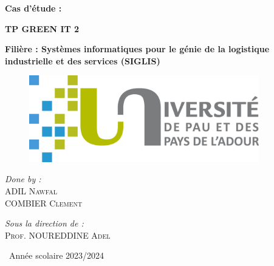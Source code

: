 \documentclass[12pt, a4paper]{report}
\begin{document}
\begin{titlepage}

	
	\begin{center}
		
		{ \Huge \bfseries Cas d'étude :}
  
		\vspace{1cm}
  
        {\bfseries\Huge TP GREEN IT 2}
		
		
		\vspace*{1cm}

        \hfill

	    
		\Large \textbf{Filière : Systèmes informatiques pour le génie de la logistique industrielle et des services (SIGLIS)}\\

        \vspace{2cm}

       
  
  
        \begin{figure}[H]
        \centering
            \includegraphics[width=10cm]{uppa.png}
        \end{figure}



        \end{center}

\vspace{3cm}


\begin{minipage}{0.4\textwidth}
\begin{flushleft} \large
\emph{Done by :}\\[0.5 cm]
ADIL \textsc{Nawfal}\\
COMBIER \textsc{Clement}\\

\end{flushleft}
\end{minipage}
\hfill
\begin{minipage}{0.5\textwidth}
\begin{flushright} \large
\emph{Sous la direction de :} \\[0.5 cm]
\textsc{Prof. NOUREDDINE \textsc{Adel}}\\

\end{flushright}
\end{minipage}

\vfill

\begin{center}
{\large \ Année scolaire 2023/2024}
\end{center}
	
	\restoregeometry
	
\end{titlepage}
\end{document}
